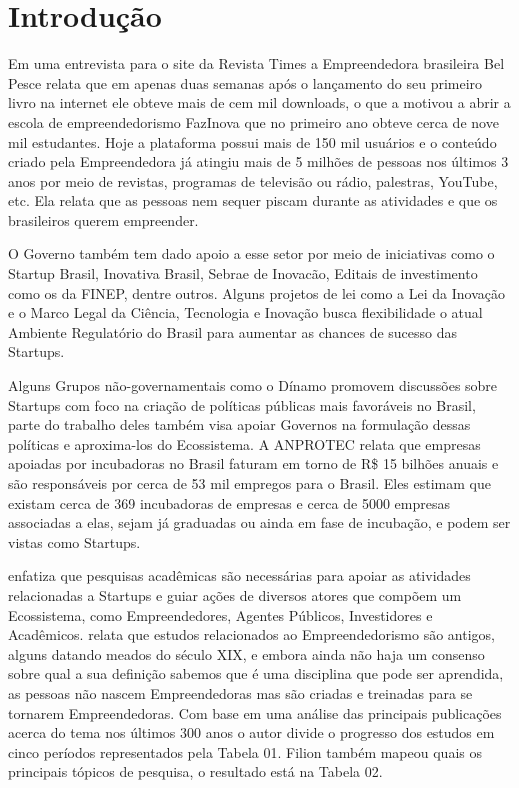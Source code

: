 \chapter{Introdução}
\label{cap-introducao}

Em uma entrevista para o site da Revista Times a Empreendedora brasileira Bel Pesce relata que em apenas duas semanas após o lançamento do seu primeiro livro na internet ele obteve mais de cem mil downloads, o que a motivou a abrir a escola de empreendedorismo FazInova que no primeiro ano obteve cerca de nove mil estudantes. Hoje a plataforma possui mais de 150 mil usuários e o conteúdo criado pela Empreendedora já atingiu mais de 5 milhões de pessoas nos últimos 3 anos por meio de revistas, programas de televisão ou rádio, palestras, YouTube, etc. Ela relata que as pessoas nem sequer piscam durante as atividades e que os brasileiros querem empreender.

O Governo também tem dado apoio a esse setor por meio de iniciativas como o Startup Brasil, Inovativa Brasil, Sebrae de Inovacão, Editais de investimento como os da FINEP, dentre outros. Alguns projetos de lei como a Lei da Inovação e o Marco Legal da Ciência, Tecnologia e Inovação busca flexibilidade o atual Ambiente Regulatório do Brasil para aumentar as chances de sucesso das Startups. 

Alguns Grupos não-governamentais como o Dínamo promovem discussões sobre Startups com foco na criação de políticas públicas mais favoráveis no Brasil, parte do trabalho deles também visa apoiar Governos na formulação dessas políticas e aproxima-los do Ecossistema. A ANPROTEC relata que empresas apoiadas por incubadoras no Brasil faturam em torno de R\$ 15 bilhões anuais e são responsáveis por cerca de 53 mil empregos para o Brasil. Eles estimam que existam cerca de 369 incubadoras de empresas e cerca de 5000 empresas associadas a elas, sejam já graduadas ou ainda em fase de incubação, e podem ser vistas como Startups. 

 enfatiza que pesquisas acadêmicas são necessárias para apoiar as atividades relacionadas a Startups e guiar ações de diversos atores que compõem um Ecossistema, como Empreendedores, Agentes Públicos, Investidores e Acadêmicos.  relata que estudos relacionados ao Empreendedorismo são antigos, alguns datando meados do século XIX, e embora ainda não haja um consenso sobre qual a sua definição sabemos que é uma disciplina que pode ser aprendida, as pessoas não nascem Empreendedoras mas são criadas e treinadas para se tornarem Empreendedoras. Com base em uma análise das principais publicações acerca do tema nos últimos 300 anos o autor divide o progresso dos estudos em cinco períodos representados pela Tabela 01. Filion também mapeou quais os principais tópicos de pesquisa, o resultado está na Tabela 02.

